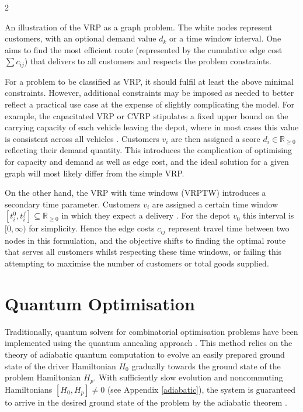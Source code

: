 \documentclass [10pt]{article}
\begin{document}
\begin {multicols}{2}
\vspace {0.3cm}
\begin {center}
	{
	An illustration of the VRP as a graph problem. The white nodes represent
	customers, with an optional demand value $d_k$ or a time window interval.
	One aims to find the most efficient route (represented by the cumulative
	edge cost $\sum{c_{ij}}$) that delivers to all customers and respects the
	problem constraints.
}
\end {center}
\vspace {0.3cm}

For a problem to be classified as VRP, it should fulfil at least the above
minimal constraints. However, additional constraints may be imposed as
needed to better reflect a practical use case at the expense of slightly
complicating the model. For example, the capacitated VRP or CVRP stipulates
a fixed upper bound on the carrying capacity of each vehicle leaving the
depot, where in most cases this value is consistent across all vehicles
\cite{cvrpanneal}.
Customers $v_i$ are then assigned a score $d_i \in \mathbb R_{\ge 0}$ 
reflecting their demand quantity. This introduces the complication of
optimising for capacity and demand as well as edge cost, and the ideal
solution for a given graph will most likely differ from the simple VRP.

On the other hand, the VRP with time windows (VRPTW) introduces a secondary
time parameter. Customers $v_i$ are assigned a certain time window
$[t_i^0, t_i^f] \subseteq \mathbb R_{\ge 0}$ in which they expect a delivery
\cite{effvrp}.
For the depot $v_0$ this interval is $[0, \infty)$ for simplicity. Hence the
edge costs $c_{ij}$ represent travel time between two nodes in this
formulation, and the objective shifts to finding the optimal route that
serves all customers whilst respecting these time windows, or failing this
attempting to maximise the number of customers or total goods supplied.

\section {Quantum Optimisation}
Traditionally, quantum solvers for combinatorial optimisation problems have
been implemented using the quantum annealing approach \cite{annealising}
\cite{annealspinglass}. This method relies on the theory of adiabatic quantum
computation \cite{adiabaticsat} to evolve an easily prepared
ground state of the driver Hamiltonian $H_0$ gradually towards the ground state
of the problem Hamiltonian $H_p$. With sufficiently slow evolution and
noncommuting Hamiltonians $[H_0, H_p] \neq 0$ (see Appendix \ref{adiabatic}),
the system is guaranteed to arrive in the desired ground state of the problem
by the adiabatic theorem \cite{adiabatictheo}.


\end{multicols}
\end{document}
